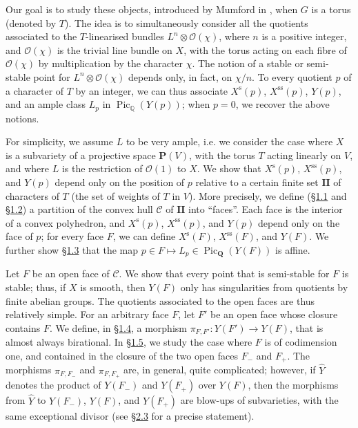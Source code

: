 \documentclass{article}
\theoremstyle{plain}
\theoremstyle{definition}
\newcommand{\scr}[1]{{\mathscr{#1}}}
\newcommand{\PP}{\mathbf{P}}
\newcommand{\QQ}{\mathbf{Q}}
\newcommand{\s}{\mathrm{s}}
\renewcommand{\ss}{\mathrm{ss}}
\newcommand{\II}{\mathbf{II}}
\DeclareMathOperator{\Pic}{Pic}
\newcommand{\oldpage}[1]{\marginpar{\footnotesize$\Big\vert$ \textit{p.~#1}}}
\begin{document}
Our goal is to study these objects, introduced by Mumford in \cite{MF}, when $G$ is a torus (denoted by $T$).
The idea is to simultaneously consider all the quotients associated to the $T$-linearised bundles $L^n\otimes\scr{O}(\chi)$, where $n$ is a positive integer, and $\scr{O}(\chi)$ is the trivial line bundle on $X$, with the torus acting on each fibre of $\scr{O}(\chi)$ by multiplication by the character $\chi$.
The notion of a stable or semi-stable point for $L^n\otimes\scr{O}(\chi)$ depends only, in fact, on $\chi/n$.
\oldpage{510}
To every quotient $p$ of a character of $T$ by an integer, we can thus associate $X^\s(p)$, $X^\ss(p)$, $Y(p)$, and an ample class $L_p$ in $\Pic_\mathbb{Q}(Y(p))$;
when $p=0$, we recover the above notions.

For simplicity, we assume $L$ to be very ample, i.e. we consider the case where $X$ is a subvariety of a projective space $\PP(V)$, with the torus $T$ acting linearly on $V$, and where $L$ is the restriction of $\scr{O}(1)$ to $X$.
We show that $X^\s(p)$, $X^\ss(p)$, and $Y(p)$ depend only on the position of $p$ relative to a certain finite set $\II$ of characters of $T$ (the set of weights of $T$ in $V$).
More precisely, we define (\hyperref[1.1]{\S1.1} and \hyperref[1.2]{\S1.2}) a partition of the convex hull $\mathcal{C}$ of $\II$ into ``faces''.
Each face is the interior of a convex polyhedron, and $X^\s(p)$, $X^\ss(p)$, and $Y(p)$ depend only on the face of $p$;
for every face $F$, we can define $X^\s(F)$, $X^\ss(F)$, and $Y(F)$.
We further show \hyperref[1.3]{\S1.3} that the map $p\in F\mapsto L_p\in\Pic_\QQ(Y(F))$ is affine.

Let $F$ be an open face of $\mathcal{C}$.
We show that every point that is semi-stable for $F$ is stable;
thus, if $X$ is smooth, then $Y(F)$ only has singularities from quotients by finite abelian groups.
The quotients associated to the open faces are thus relatively simple.
For an arbitrary face $F$, let $F'$ be an open face whose closure contains $F$.
We define, in \hyperref[1.4]{\S1.4}, a morphism $\pi_{F,F'}\colon Y(F')\to Y(F)$, that is almost always birational.
In \hyperref[1.5]{\S1.5}, we study the case where $F$ is of codimension one, and contained in the closure of the two open faces $F_-$ and $F_+$.
The morphisms $\pi_{F,F_-}$ and $\pi_{F,F_+}$ are, in general, quite complicated;
however, if $\hat{Y}$ denotes the product of $Y(F_-)$ and $Y(F_+)$ over $Y(F)$, then the morphisms from $\hat{Y}$ to $Y(F_-)$, $Y(F)$, and $Y(F_+)$ are blow-ups of subvarieties, with the same exceptional divisor (see \hyperref[2.3]{\S2.3} for a precise statement).
\end{document}
